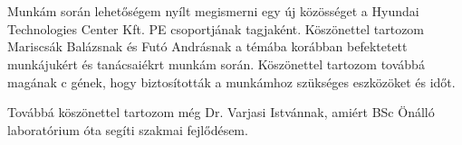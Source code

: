 \chapter*{\koszonetnyilvanitas}

Munkám során lehetőségem nyílt megismerni egy új közösséget a Hyundai Technologies Center Kft. PE csoportjának tagjaként. Köszönettel tartozom Mariscsák Balázsnak és Futó Andrásnak a témába korábban befektetett munkájukért és tanácsaiékrt munkám során. Köszönettel tartozom továbbá magának c gének, hogy biztosították a munkámhoz szükséges eszközöket és időt.

Továbbá köszönettel tartozom még Dr. Varjasi Istvánnak, amiért BSc Önálló laboratórium óta segíti szakmai fejlődésem.